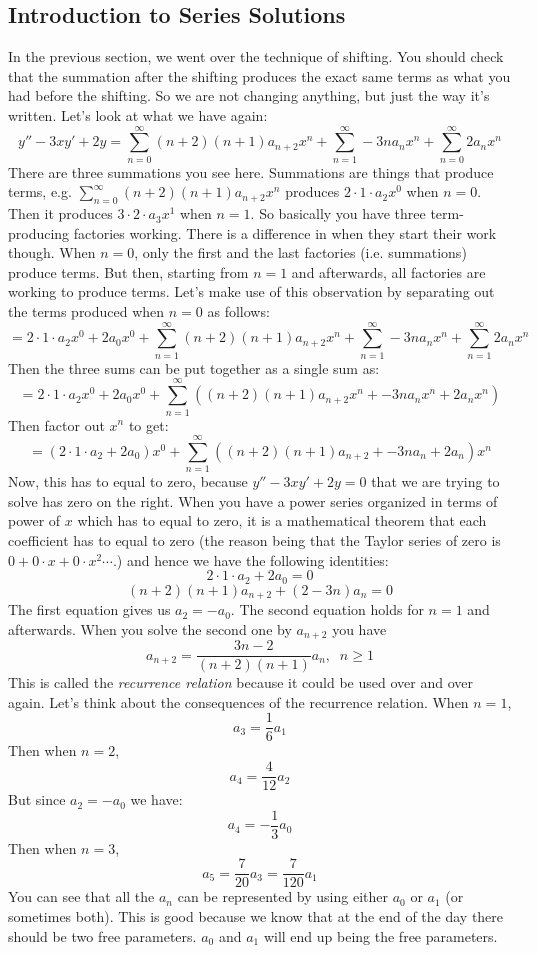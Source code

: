 \documentclass[12pt]{report}
\begin{document}
\subsection*{Introduction to Series Solutions}

In the previous section, we went over the technique of shifting. You should check that the summation after the shifting produces the exact same terms as what you had before the shifting. So we are not changing anything, but just the way it's written.
Let's look at what we have again:
$$y'' - 3xy'+2y= \sum_{n=0}^{\infty} (n+2) (n+1) a_{n+2} x^{n} + \sum_{n=1}^{\infty} -3 n a_n x^{n}+\sum_{n=0}^{\infty} 2a_n x^{n}$$
There are three summations you see here. Summations are things that produce terms, e.g. $\sum_{n=0}^{\infty} (n+2) (n+1) a_{n+2} x^{n}$ produces $2\cdot 1 \cdot a_2 x^0$ when $n=0$. Then it produces $3\cdot 2 \cdot a_3 x^1$ when $n=1$.
So basically you have three term-producing factories working. There is a difference in when they start their work though. When $n=0$, only the first and the last factories (i.e. summations) produce terms. But then, starting from $n=1$ and afterwards, all factories are working to produce terms.
Let's make use of this observation by separating out the terms produced when $n=0$ as follows:
$$=2\cdot 1 \cdot a_2 x^0+2a_0x^0 + \sum_{n=1}^{\infty} (n+2) (n+1) a_{n+2} x^{n} + \sum_{n=1}^{\infty} -3 n a_n x^{n}+\sum_{n=1}^{\infty} 2a_n x^{n}$$
Then the three sums can be put together as a single sum as:
$$=2\cdot 1 \cdot a_2 x^0+2a_0x^0 + \sum_{n=1}^{\infty} \left( (n+2) (n+1) a_{n+2} x^{n} +  -3 n a_n x^{n}+ 2a_n x^{n} \right)$$
Then factor out $x^n$ to get:
$$=(2\cdot 1 \cdot a_2+2a_0) x^0 + \sum_{n=1}^{\infty} \left( (n+2) (n+1) a_{n+2}  +  -3 n a_n + 2a_n  \right)x^{n}$$
Now, this has to equal to zero, because $y'' - 3xy'+2y=0$ that we are trying to solve has zero on the right. When you have a power series organized in terms of power of $x$ which has to equal to zero, it is a mathematical theorem that each coefficient has to equal to zero (the reason being that the Taylor series of zero is $0+0\cdot x+0\cdot x^2\cdots$.) and hence we have the following identities:
$$ 2\cdot 1 \cdot a_2+2a_0=0$$
$$ (n+2) (n+1) a_{n+2}  +  (2-3 n) a_n =0 $$
The first equation gives us $a_2 = -a_0$. The second equation holds for $n=1$ and afterwards. When you solve the second one by $a_{n+2}$ you have
$$ a_{n+2} = \frac{3n-2}{(n+2) (n+1)} a_n, \; \; n\geq 1 $$
This is called the \textit{recurrence relation} because it could be used over and over again.
Let's think about the consequences of the recurrence relation. When $n=1$,
$$a_3 = \frac{1}{6} a_1 $$
Then when $n=2$,
$$a_4 = \frac{4}{12} a_2$$
But since $a_2 = -a_0$ we have:
$$a_4 = - \frac{1}{3} a_0$$
Then when $n=3$,
$$a_5 = \frac{7}{20} a_3 = \frac{7}{120} a_1 $$
You can see that all the $a_n$ can be represented by using either $a_0$ or $a_1$ (or sometimes both). This is good because we know that at the end of the day there should be two free parameters. $a_0$ and $a_1$ will end up being the free parameters.
\end{document}
